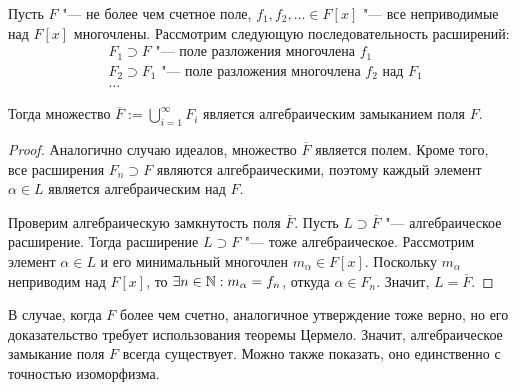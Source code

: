 \begin{proposition}
	Пусть $F$ "--- не более чем счетное поле, $f_1, f_2, \dotsc \in F[x]$ "--- все неприводимые над $F[x]$ многочлены. Рассмотрим следующую последовательность расширений:
	\begin{align*}
		&F_1 \supset F\text{ "--- поле разложения многочлена } f_1\\
		&F_2 \supset F_1\text{ "--- поле разложения многочлена } f_2 \text{ над } F_1\\
		&\dots
	\end{align*}
	
	Тогда множество $\overline{F} := \bigcup_{i = 1}^\infty F_i$ является алгебраическим замыканием поля $F$.
\end{proposition}

\begin{proof}
	Аналогично случаю идеалов, множество $\overline{F}$ является полем. Кроме того, все расширения $F_n \supset F$ являются алгебраическими, поэтому каждый элемент $\alpha \in L$ является алгебраическим над $F$.
	
	Проверим алгебраическую замкнутость поля $\overline{F}$. Пусть $L \supset \overline{F}$ "--- алгебраическое расширение. Тогда расширение $L \supset F$ "--- тоже алгебраическое. Рассмотрим элемент $\alpha \in L$ и его минимальный многочлен $m_\alpha \in F[x]$. Поскольку $m_\alpha$ неприводим над $F[x]$, то $\exists n \in \mathbb{N}: m_\alpha = f_n$, откуда $\alpha \in F_n$. Значит, $L = \overline{F}$.
\end{proof}

\begin{note}
	В случае, когда $F$ более чем счетно, аналогичное утверждение тоже верно, но его доказательство требует использования теоремы Цермело. Значит, алгебраическое замыкание поля $F$ всегда существует. Можно также показать, оно единственно с точностью изоморфизма.
\end{note}